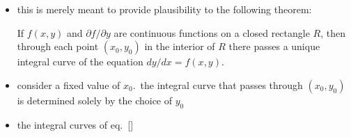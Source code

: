 \documentclass[../jaynes_prob_theory_notes.tex]{subfiles}
\begin{document}
\begin{itemize}
\begin{itemize}
                \end{itemize}
            \item this is merely meant to provide plausibility to the following theorem:
                \begin{theorem}
                    If $f(x,y)$ and $\partial f/ \partial y$ are continuous functions on a closed rectangle $R$, then through each point $(x_0, y_0)$ in the interior of $R$ there passes a unique integral curve of the equation $dy/dx = f(x,y)$.
                \end{theorem}
            \item consider a fixed value of $x_0$.\ the integral curve that passes through $(x_0, y_0)$ is determined solely by the choice of $y_0$
            \item the integral curves of eq.~\ref{}
        \end{itemize}
\end{document}

